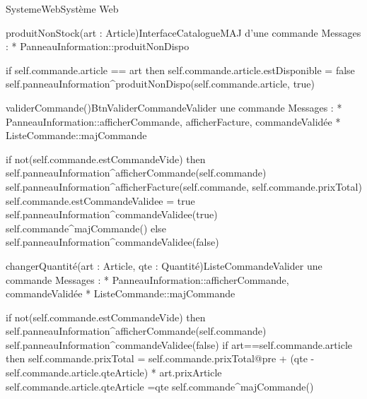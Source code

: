 \begin{OM}{SystemeWeb}{Système Web}
\begin{OMOperation}{produitNonStock(art : Article)}{InterfaceCatalogue}{MAJ d'une commande}
Messages :
* PanneauInformation::{produitNonDispo}
\begin{OMPre}
\end{OMPre}
\begin{OMPost}
        if self.commande.article == art then
                self.commande.article.estDisponible = false
                self.panneauInformation^produitNonDispo(self.commande.article, true)
            \end{OMPost}
\end{OMOperation}

\begin{OMOperation}{validerCommande()}{BtnValiderCommande}{Valider une commande}
Messages :
* PanneauInformation::{afficherCommande, afficherFacture, commandeValidée}
* ListeCommande::{majCommande}
\begin{OMPre}
\end{OMPre}
\begin{OMPost}
if not(self.commande.estCommandeVide) then
        self.panneauInformation^afficherCommande(self.commande)
self.panneauInformation^afficherFacture(self.commande,
self.commande.prixTotal)
                self.commande.estCommandeValidee = true
                self.panneauInformation^commandeValidee(true)
                self.commande^majCommande()
        else
                self.panneauInformation^commandeValidee(false)
            \end{OMPost}
\end{OMOperation}

\begin{OMOperation}{changerQuantité(art : Article, qte : Quantité)}{ListeCommande}{Valider une commande}
Messages :
* PanneauInformation::{afficherCommande, commandeValidée}
* ListeCommande::{majCommande}
\begin{OMPre}
\end{OMPre}
\begin{OMPost}
if not(self.commande.estCommandeVide) then
                self.panneauInformation^afficherCommande(self.commande)
                self.panneauInformation^commandeValidee(false)
                if art==self.commande.article then
                        self.commande.prixTotal = self.commande.prixTotal@pre + (qte -
self.commande.article.qteArticle) * art.prixArticle
                        self.commande.article.qteArticle =qte
                self.commande^majCommande()
            \end{OMPost}
\end{OMOperation}


\end{OM}
